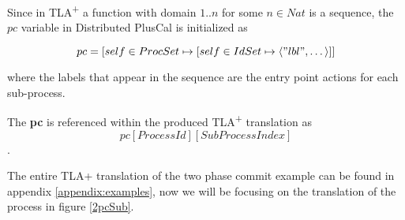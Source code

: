 \documentclass{thesul}
\newcommand{\tlaplus}{TLA\textsuperscript{+}\xspace}
\newcommand{\seq}[1]{\langle #1 \rangle}
\begin{document}
Since in \tlaplus a function with domain $1..n$ for some $n \in Nat$ is a sequence, the $pc$ variable in Distributed PlusCal is initialized as

\[
pc = [self \in ProcSet \mapsto [self \in IdSet \mapsto \seq{"lbl",\dots}]]
\]	

where the labels that appear in the sequence are the entry point actions for each sub-process. 

The \textbf{pc} is referenced within the produced \tlaplus translation as \[ pc[Process Id][SubProcess Index] \].
		  
The entire TLA+ translation of the two phase commit example can be found in appendix \ref{appendix:examples}, now we will be focusing on the translation of the process in figure \ref{2pcSub}.

\hfill\\
\end{document}
